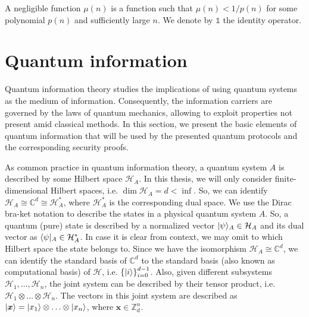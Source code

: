 A negligible function $\mu(n)$ is a function such that $\mu(n) < 1/p(n)$ for some polynomial $p(n)$ and sufficiently large $n$. We denote by $\mathds{1}$ the identity operator. 




\section{Quantum information}

Quantum information theory studies the implications of using quantum systems as the medium of information. Consequently, the information carriers are governed by the laws of quantum mechanics, allowing to exploit properties not present amid classical methods. In this section, we present the basic elements of quantum information that will be used by the presented quantum protocols and the corresponding security proofs.

As common practice in quantum information theory, a quantum system $A$ is described by some Hilbert space $\mathcal{H}_A$. In this thesis, we will only consider finite-dimensional Hilbert spaces, i.e. $\dim \mathcal{H}_A = d < \inf$. So, we can identify $\mathcal{H}_A \cong \mathbb{C}^d \cong \mathcal{H}^{*}_A$, where $\mathcal{H}^{*}_A$ is the corresponding dual space. We use the Dirac bra-ket notation to describe the states in a physical quantum system $A$. So, a quantum (pure) state is described by a normalized vector $| \psi \rangle_A\in\mathcal{H}_A$ and its dual vector as $\langle \psi |_A\in\mathcal{H}^{*}_A$. In case it is clear from context, we may omit to which Hilbert space the state belongs to. Since we have the isomorphism $\mathcal{H}_A \cong \mathbb{C}^d$, we can identify the standard basis of $\mathbb{C}^d$ to the standard basis (also known as computational basis) of $\mathcal{H}$, i.e. $\left\{ | i \rangle \right\}_{i=0}^{d-1}$. Also, given different subsystems $\mathcal{H}_1, \ldots, \mathcal{H}_n$, the joint system can be described by their tensor product, i.e. $\mathcal{H}_1 \otimes \ldots \otimes \mathcal{H}_n$. The vectors in this joint system are described as $| \bm{x} \rangle = | x_1 \rangle \otimes \ldots \otimes | x_n \rangle$, where $\bm{x} \in \mathbb{Z}_d^n$.

